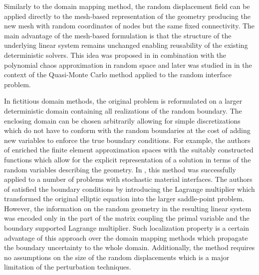 Similarly to the domain mapping method, the random displacement field can be applied directly to the mesh-based representation of the geometry producing the new mesh with random coordinates of nodes but the same fixed connectivity.
The main advantage of the mesh-based formulation is that the structure of the underlying linear system remains unchanged enabling reusability of the existing deterministic solvers.
This idea was proposed in \cite{Mohan2011} in combination with the polynomial chaos approximation in random space and later was studied in \cite{Harbrecht2014} in the context of the Quasi-Monte Carlo method applied to the random interface problem.


In fictitious domain methods, the original problem is reformulated on a larger deterministic domain containing all realizations of the random boundary.
The enclosing domain can be chosen arbitrarily allowing for simple discretizations which do not have to conform with the random boundaries at the cost of adding new variables to enforce the true boundary conditions.
For example, the authors of \cite{Nouy2007,Nouy2008} enriched the finite element approximation spaces with the suitably constructed functions which allow for the explicit representation of a solution in terms of the random variables describing the geometry.
In \cite{Savvas2014,Lang2013,Nouy2010}, this method was successfully applied to a number of problems with stochastic material interfaces.
The authors of \cite{Canuto2007} satisfied the boundary conditions by introducing the Lagrange multiplier which transformed the original elliptic equation into the larger saddle-point problem.
However, the information on the random geometry in the resulting linear system was encoded only in the part of the matrix coupling the primal variable and the boundary supported Lagrange multiplier.
Such localization property is a certain advantage of this approach over the domain mapping methods which propagate the boundary uncertainty to the whole domain.
Additionally, the method requires no assumptions on the size of the random displacements which is a major limitation of the perturbation techniques.



